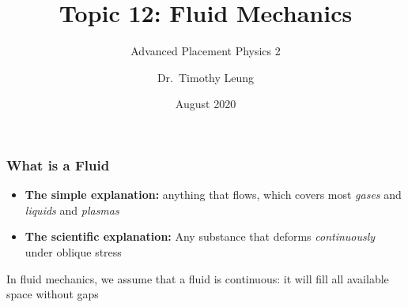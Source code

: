 \documentclass[12pt,aspectratio=169]{beamer}
\title{Topic 12: Fluid Mechanics}
\subtitle{Advanced Placement Physics 2}
\author[TML]{Dr.\ Timothy Leung}
\institute{Olympiads School}
\date{August 2020}
\begin{document}
\begin{frame}
  \maketitle
\end{frame}









\begin{frame}
  \frametitle{What is a Fluid}

  \begin{itemize}
  \item\textbf{The simple explanation:} anything that flows, which covers
    most \emph{gases} and \emph{liquids} and \emph{plasmas}
  \item\textbf{The scientific explanation:} Any substance that deforms
    \emph{continuously} under oblique stress
  \end{itemize}

  \vspace{.2in}In fluid mechanics, we assume that a fluid is continuous:
  it will fill all available space without gaps
\end{frame}
\end{document}
